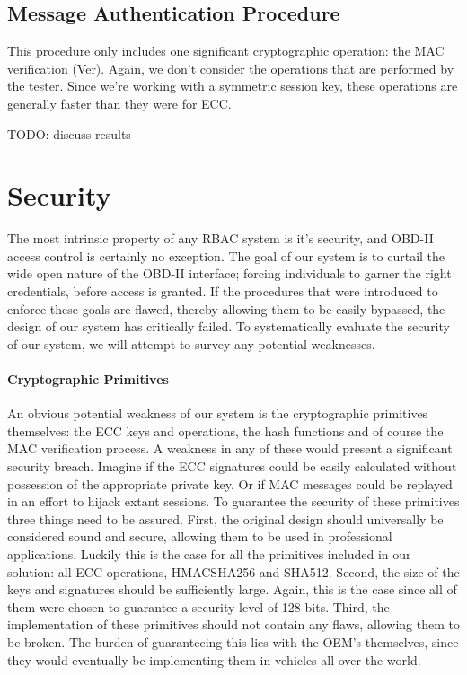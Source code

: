 \subsection{Message Authentication Procedure}
\label{subsec:speed2}

This procedure only includes one significant cryptographic operation: the MAC verification (Ver). Again, we don't consider the operations that are performed by the tester. Since we're working with a symmetric session key, these operations are generally faster than they were for ECC.

TODO: discuss results

\section{Security}
\label{sec:security}

The most intrinsic property of any RBAC system is it's security, and OBD-II access control is certainly no exception. The goal of our system is to curtail the wide open nature of the OBD-II interface; forcing individuals to garner the right credentials, before access is granted. If the procedures that were introduced to enforce these goals are flawed, thereby allowing them to be easily bypassed, the design of our system has critically failed. To systematically evaluate the security of our system, we will attempt to survey any potential weaknesses.


\paragraph{Cryptographic Primitives} An obvious potential weakness of our system is the cryptographic primitives themselves: the ECC keys and operations, the hash functions and of course the MAC verification process. A weakness in any of these would present a significant security breach. Imagine if the ECC signatures could be easily calculated without possession of the appropriate private key. Or if MAC messages could be replayed in an effort to hijack extant sessions. To guarantee the security of these primitives three things need to be assured. First, the original design should universally be considered sound and secure, allowing them to be used in professional applications. Luckily this is the case for all the primitives included in our solution: all ECC operations, HMAC\textunderscore SHA256 and SHA512. Second, the size of the keys and signatures should be sufficiently large. Again, this is the case since all of them were chosen to guarantee a security level of 128 bits. Third, the implementation of these primitives should not contain any flaws, allowing them to be broken. The burden of guaranteeing this lies with the OEM's themselves, since they would eventually be implementing them in vehicles all over the world. 

